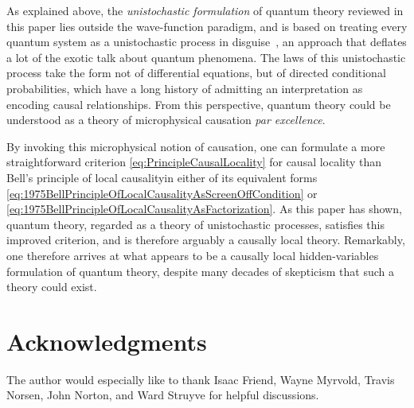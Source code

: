\documentclass[twoside,twocolumn,english,prl,superscriptaddress,nobibnotes,nofootinbib]{revtex4-2}
\begin{document}
As explained above, the \emph{unistochastic formulation} of quantum
theory reviewed in this paper lies outside the wave-function paradigm,
and is based on treating every quantum system as a unistochastic process
in disguise~\citep{Barandes:2023tsqc,Barandes:2023tsqt}, an approach
that deflates a lot of the exotic talk about quantum phenomena. The
laws of this unistochastic process take the form not of differential
equations, but of directed conditional probabilities, which have a
long history of admitting an interpretation as encoding causal relationships.
From this perspective, quantum theory could be understood as a theory
of microphysical causation \emph{par excellence}.

By invoking this microphysical notion of causation, one can formulate
a more straightforward criterion \eqref{eq:PrincipleCausalLocality}
for causal locality than Bell's principle of local causality\textemdash in
either of its equivalent forms \eqref{eq:1975BellPrincipleOfLocalCausalityAsScreenOffCondition}
or \eqref{eq:1975BellPrincipleOfLocalCausalityAsFactorization}. As
this paper has shown, quantum theory, regarded as a theory of unistochastic
processes, satisfies this improved criterion, and is therefore arguably
a causally local theory. Remarkably, one therefore arrives at what
appears to be a causally local hidden-variables formulation of quantum
theory, despite many decades of skepticism that such a theory could
exist.

\section*{Acknowledgments}

The author would especially like to thank Isaac Friend, Wayne Myrvold,
Travis Norsen, John Norton, and Ward Struyve for helpful discussions.



\end{document}
